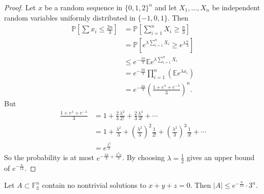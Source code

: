 \documentclass{article}
\newcommand{\1}[1]{\mathbbm{1}_{#1}}
\begin{document}
\begin{proof}
  Let $x$ be a random sequence in $\{0,1,2\}^n$ and let $X_1, \dotsc, X_n$ be independent random variables uniformly distributed in $\{-1,0,1\}$.
  Then
  \begin{align*}
    \mathbb{P}\left[\sum x_i \leq \frac{2n}{3}\right] &= \mathbb{P}\left[\sum_{i=1}^n X_i \geq \frac{n}{3}\right] \\
                                           &= \mathbb{P}\left[e^{\lambda \sum_{i=1}^n X_i} \geq e^{\lambda \frac{n}{3}}\right] \\
                                           &\leq e^{-\frac{\lambda n}{3}} \mathbb{E} e^{\lambda \sum_{i=1}^n X_i} \\
                                           &= e^{-\frac{\lambda n}{3}} \prod_{i=1}^n (\mathbb{E} e^{\lambda x_i}) \\
                                           &= e^{-\frac{\lambda n}{3}} \left(\frac{1 + e^\lambda + e^{-\lambda}}{3}\right)^n.
  \end{align*}
  But
  \begin{align*}
    \frac{1+e^\lambda + e^{-\lambda}}{3} &= 1 + \frac{2}{3} \frac{\lambda^2}{2!} + \frac{2}{3} \frac{\lambda^4}{4!} + \dotsb \\
                                         &= 1 + \frac{\lambda^2}{3} + \left(\frac{\lambda^2}{3}\right)^2 \frac{1}{2!} + \left(\frac{\lambda^2}{3}\right)^3 \frac{1}{3!} + \dotsb \\
                                         &= e^{\frac{\lambda^2}{3}}
  \end{align*}
  So the probability is at most $e^{-\frac{\lambda n}{3} + \frac{\lambda^2 n}{3}}$.
  By choosing $\lambda = \frac{1}{2}$ gives an upper bound of $e^{-\frac{n}{12}}$.
\end{proof}
\begin{nthm}
  Let $A \subset \mathbb{F}_3^n$ contain no nontrivial solutions to $x+y+z=0$. Then $|A| \leq e^{-\frac{n}{12}} \cdot 3^n$.
\end{nthm}
\end{document}
